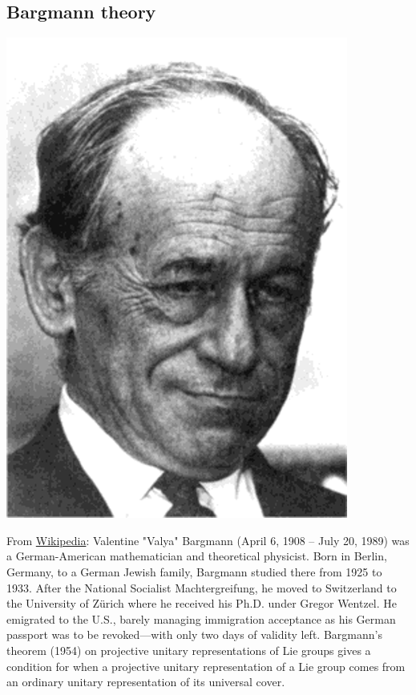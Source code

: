 \documentclass[../main.tex]{subfiles}
\begin{document}
\subsection{Bargmann theory}
\begin{marginfigure}
	\includegraphics[width=1\linewidth]{images/Bargmann.png}
	\caption[Photo of Bargmann]{From \href{https://en.wikipedia.org/wiki/Valentine_Bargmann}{Wikipedia}: Valentine "Valya" Bargmann (April 6, 1908 – July 20, 1989) was a German-American mathematician and theoretical physicist. Born in Berlin, Germany, to a German Jewish family, Bargmann studied there from 1925 to 1933. After the National Socialist Machtergreifung, he moved to Switzerland to the University of Zürich where he received his Ph.D. under Gregor Wentzel. He emigrated to the U.S., barely managing immigration acceptance as his German passport was to be revoked—with only two days of validity left. Bargmann's theorem (1954) on projective unitary representations of Lie groups gives a condition for when a projective unitary representation of a Lie group comes from an ordinary unitary representation of its universal cover. }
\end{marginfigure}
\end{document}
